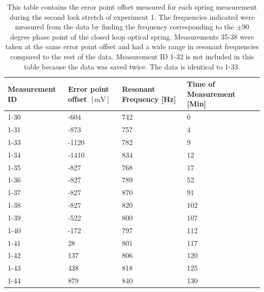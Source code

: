 \begin{table}
  \begin{center}
    \footnotesize
    \begin{tabular}{|l|l|l|l|}
      \hline
      Measurement ID & Error point offset $[\mathrm{mV}]$ &
        Resonant Frequency [Hz] & Time of Measurement [Min] \\
      \hline
      \hline
      1-30 & -604  & 742 & 0 \\
      1-31 & -873  & 757 & 4 \\
      1-33 & -1120 & 782 & 9 \\
      1-34 & -1410 & 834 & 12 \\
      1-35 & -827  & 768 & 17 \\
      1-36 & -827  & 789 & 52 \\
      1-37 & -827  & 870 & 91 \\
      1-38 & -827  & 820 & 102 \\
      1-39 & -522  & 800 & 107 \\
      1-40 & -172  & 797 & 112 \\
      1-41 & 28    & 801 & 117 \\
      1-42 & 137   & 806 & 120 \\
      1-43 & 438   & 818 & 125 \\
      1-44 & 879   & 840 & 130 \\
      \hline
    \end{tabular}
  \end{center}
  \caption[Experiment 1 Spring Measurements]{
      This table contains the error point offset measured for each spring
      measurement during the second lock stretch of experiment 1.
      The frequencies indicated were measured from the data by finding the
      frequency corresponding to the $\pm 90$ degree phase point of the closed
      loop optical spring.
      Measurements 35-38 were taken at the same error point offset and had
      a wide range in resonant frequencies compared to the rest of the data.
      Measurement ID 1-32 is not included in this table because the data was
      saved twice.
      The data is identical to 1-33.
      }
  \label{tab:experiment1lock2}
\end{table}

